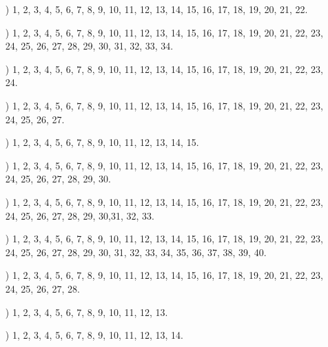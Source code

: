 \documentclass[a4paper,11pt]{article}
\numberwithin{equation}{section}
\begin{document}
\label{sec:Oznaczenia-i-konwencje}


\begin{itemize}

\item[\romannumeral2)]  1, 2, 3, 4, 5, 6, 7, 8, 9, 10, 11, 12, 13, 14, 15,
  16, 17, 18, 19, 20, 21, 22.

\item[\romannumeral3)] 1, 2, 3, 4, 5, 6, 7, 8, 9, 10, 11, 12, 13, 14, 15,
  16, 17, 18, 19, 20, 21, 22, 23, 24, 25, 26, 27, 28, 29, 30, 31, 32, 33,
  34.

\item[\romannumeral4)] 1, 2, 3, 4, 5, 6, 7, 8, 9, 10, 11, 12, 13, 14, 15,
  16, 17, 18, 19, 20, 21, 22, 23, 24.

\item[\romannumeral5)] 1, 2, 3, 4, 5, 6, 7, 8, 9, 10, 11, 12, 13, 14, 15,
  16, 17, 18, 19, 20, 21, 22, 23, 24, 25, 26, 27.

\item[\romannumeral6)] 1, 2, 3, 4, 5, 6, 7, 8, 9, 10, 11, 12, 13, 14, 15.

\item[\romannumeral7)] 1, 2, 3, 4, 5, 6, 7, 8, 9, 10, 11, 12, 13, 14, 15,
  16, 17, 18, 19, 20, 21, 22, 23, 24, 25, 26, 27, 28, 29, 30.

\item[\romannumeral8)] 1, 2, 3, 4, 5, 6, 7, 8, 9, 10, 11, 12, 13, 14, 15,
  16, 17, 18, 19, 20, 21, 22, 23, 24, 25, 26, 27, 28, 29, 30,31, 32, 33.

\item[\romannumeral9)] 1, 2, 3, 4, 5, 6, 7, 8, 9, 10, 11, 12, 13, 14, 15,
  16, 17, 18, 19, 20, 21, 22, 23, 24, 25, 26, 27, 28, 29, 30, 31, 32, 33,
  34, 35, 36, 37, 38, 39, 40.

\item[\romannumeral10)] 1, 2, 3, 4, 5, 6, 7, 8, 9, 10, 11, 12, 13, 14, 15,
  16, 17, 18, 19, 20, 21, 22, 23, 24, 25, 26, 27, 28.

\item[\romannumeral11)] 1, 2, 3, 4, 5, 6, 7, 8, 9, 10, 11, 12, 13.

\item[\romannumeral12)] 1, 2, 3, 4, 5, 6, 7, 8, 9, 10, 11, 12, 13, 14.

\end{itemize}
\end{document}

